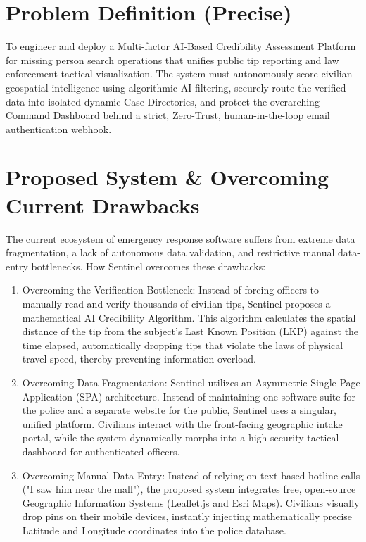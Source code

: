 \documentclass[12pt,a4paper]{report}
\begin{document}
\section{Problem Definition (Precise)}
To engineer and deploy a Multi-factor AI-Based Credibility Assessment Platform for missing person search operations that unifies public tip reporting and law enforcement tactical visualization. The system must autonomously score civilian geospatial intelligence using algorithmic AI filtering, securely route the verified data into isolated dynamic Case Directories, and protect the overarching Command Dashboard behind a strict, Zero-Trust, human-in-the-loop email authentication webhook.

\section{Proposed System \& Overcoming Current Drawbacks}
The current ecosystem of emergency response software suffers from extreme data fragmentation, a lack of autonomous data validation, and restrictive manual data-entry bottlenecks. How Sentinel overcomes these drawbacks:
\begin{enumerate}
    \item Overcoming the Verification Bottleneck: Instead of forcing officers to manually read and verify thousands of civilian tips, Sentinel proposes a mathematical AI Credibility Algorithm. This algorithm calculates the spatial distance of the tip from the subject's Last Known Position (LKP) against the time elapsed, automatically dropping tips that violate the laws of physical travel speed, thereby preventing information overload.
    \item Overcoming Data Fragmentation: Sentinel utilizes an Asymmetric Single-Page Application (SPA) architecture. Instead of maintaining one software suite for the police and a separate website for the public, Sentinel uses a singular, unified platform. Civilians interact with the front-facing geographic intake portal, while the system dynamically morphs into a high-security tactical dashboard for authenticated officers.
    \item Overcoming Manual Data Entry: Instead of relying on text-based hotline calls ("I saw him near the mall"), the proposed system integrates free, open-source Geographic Information Systems (Leaflet.js and Esri Maps). Civilians visually drop pins on their mobile devices, instantly injecting mathematically precise Latitude and Longitude coordinates into the police database.
\end{enumerate}
\end{document}
